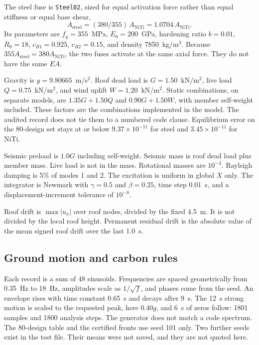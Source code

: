 \documentclass[10pt,a4paper]{article}
\begin{document}
The steel fuse is \texttt{Steel02}, sized for equal activation force rather than equal stiffness or equal base shear,
\begin{equation}
  A_{\mathrm{steel}}=(380/355)\,A_{\mathrm{NiTi}}=1.0704\,A_{\mathrm{NiTi}}.
\end{equation}
Its parameters are $f_y=355$~MPa, $E_0=200$~GPa, hardening ratio $b=0.01$, $R_0=18$, $c_{R1}=0.925$, $c_{R2}=0.15$, and density 7850~kg/m$^3$. Because $355 A_{\mathrm{steel}}=380 A_{\mathrm{NiTi}}$, the two fuses activate at the same axial force. They do not have the same $EA$.

Gravity is $g=9.80665$~m/s$^2$. Roof dead load is $G=1.50$~kN/m$^2$, live load $Q=0.75$~kN/m$^2$, and wind uplift $W=1.20$~kN/m$^2$. Static combinations, on separate models, are $1.35G+1.50Q$ and $0.90G+1.50W$, with member self-weight included. These factors are the combinations implemented in the model. The audited record does not tie them to a numbered code clause. Equilibrium error on the 80-design set stays at or below $9.37\times 10^{-11}$ for steel and $3.45\times 10^{-11}$ for NiTi.

Seismic preload is $1.0G$ including self-weight. Seismic mass is roof dead load plus member mass. Live load is not in the mass. Rotational masses are $10^{-3}$. Rayleigh damping is 5\% of modes 1 and 2. The excitation is uniform in global $X$ only. The integrator is Newmark with $\gamma=0.5$ and $\beta=0.25$, time step 0.01~s, and a displacement-increment tolerance of $10^{-8}$.

Roof drift is $\max|u_x|$ over roof nodes, divided by the fixed 4.5~m. It is not divided by the local roof height. Permanent residual drift is the absolute value of the mean signed roof drift over the last 1.0~s.

\subsection{Ground motion and carbon rules}

Each record is a sum of 48 sinusoids. Frequencies are spaced geometrically from 0.35~Hz to 18~Hz, amplitudes scale as $1/\sqrt{f}$, and phases come from the seed. An envelope rises with time constant 0.65~s and decays after 9~s. The 12~s strong motion is scaled to the requested peak, here $0.40g$, and 6~s of zeros follow: 1801 samples and 1800 analysis steps. The generator does not match a code spectrum. The 80-design table and the certified fronts use seed 101 only. Two further seeds exist in the test file. Their means were not saved, and they are not quoted here.
\end{document}
